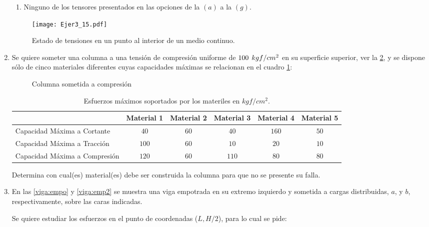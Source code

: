 \documentclass[../notas medios.tex]{subfiles}
\begin{document}
\begin{enumerate}
\begin{enumerate}
		\item Ninguno de los tensores presentados en las opciones de la $(a)$ a la $(g)$.
	\end{enumerate}
%
\begin{figure}[H]
	\centering
	\texttt{[image: Ejer3\_15.pdf]}
	\caption{Estado de tensiones en un punto al interior de un medio continuo.}
	\label{otro:esta}
\end{figure}
%
\item \label{punto16} Se quiere someter una columna a una tensi\'on de
compresi\'on uniforme de $100\hspace{.15cm} kgf/cm^2$ en su superficie superior, ver la  \cref{ColComp}, y se dispone s\'olo de cinco materiales diferentes cuyas capacidades m\'aximas se relacionan en el cuadro \cref{tab:materiales}:
%
\begin{figure}[H]
	\centering
		\hspace{2.0cm}
	\label{ColComp}
	\caption{Columna sometida a compresión}
\end{figure}
%
\begin{table}[H]
\center
\small
    \begin{tabular}{ p{10cm}  c  c  c  c  c}
     & Material 1 & Material 2 & Material 3 & Material 4 & Material 5 \\ \hline
    Capacidad M\'axima a Cortante & $40$ & $60$ & $40$ & $160$ & $50$\\
    Capacidad M\'axima a Tracci\'on & $100$ & $60$ & $10$ & $20$ & $10$\\ 
    Capacidad M\'axima a Compresi\'on & $120$ & $60$ & $110$ & $80$ & $80$\\    
   \end{tabular}
\caption {Esfuerzos m\'aximos soportados por los materiles en $kgf/cm^2$.} \label{tab:materiales} 
\end{table}
%
Determina con cual(es) material(es) debe ser construida la columna para que no se presente su falla. 
%
\item \label{punto17} En las \cref{viga:empo} y  \cref{viga:emp2}  se
muestra una viga empotrada en su extremo izquierdo y sometida a cargas distribuidas, $a$,  y $b$, respectivamente, sobre las caras indicadas.\\
%
\begin{figure}[H]
	\centering
		\hspace{2.0cm}
	\caption{ }
\end{figure}
%
Se quiere estudiar los esfuerzos en el punto de coordenadas ($L,H/2$), para lo cual se pide:


\end{enumerate}
\end{document}
